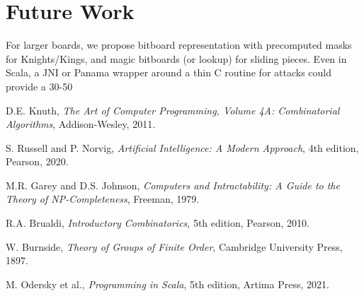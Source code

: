 \documentclass[12pt,a4paper]{article}
\theoremstyle{definition}
\begin{document}
\section{Future Work}

For larger boards, we propose bitboard representation with precomputed masks for Knights/Kings, and magic bitboards (or lookup) for sliding pieces. Even in Scala, a JNI or Panama wrapper around a thin C routine for attacks could provide a 30-50%


\begin{thebibliography}{99}

D.E. Knuth, \emph{The Art of Computer Programming, Volume 4A: Combinatorial Algorithms}, Addison-Wesley, 2011.

S. Russell and P. Norvig, \emph{Artificial Intelligence: A Modern Approach}, 4th edition, Pearson, 2020.

M.R. Garey and D.S. Johnson, \emph{Computers and Intractability: A Guide to the Theory of NP-Completeness}, Freeman, 1979.

R.A. Brualdi, \emph{Introductory Combinatorics}, 5th edition, Pearson, 2010.

W. Burnside, \emph{Theory of Groups of Finite Order}, Cambridge University Press, 1897.

M. Odersky et al., \emph{Programming in Scala}, 5th edition, Artima Press, 2021.

\end{thebibliography}
\end{document}
